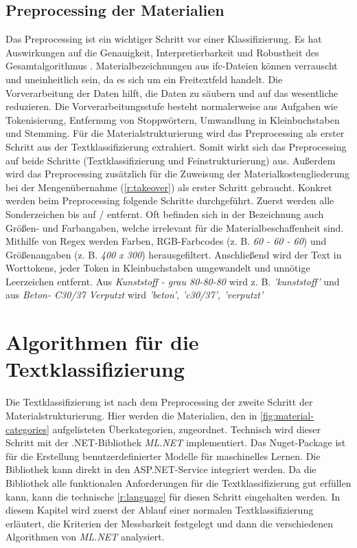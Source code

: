 \subsection{Preprocessing der Materialien}
\label{c:conception:architecture:preprocessing}
Das Preprocessing ist ein wichtiger Schritt vor einer Klassifizierung. Es hat Auswirkungen auf die Genauigkeit, Interpretierbarkeit und Robustheit des Gesamtalgorithmus \citep[vgl.][]{Zelaya_2019}. Materialbezeichnungen aus \ac{ifc}-Dateien können verrauscht und uneinheitlich sein, da es sich um ein Freitextfeld handelt. Die Vorverarbeitung der Daten hilft, die Daten zu säubern und auf das wesentliche reduzieren. \citep[vgl.][]{Priyanga_2016}
Die Vorverarbeitungsstufe besteht normalerweise aus Aufgaben wie Tokenisierung, Entfernung von Stoppwörtern, Umwandlung in Kleinbuchstaben und Stemming. \citep[vgl.][]{Uysal_2014}
Für die Materialstrukturierung wird das Preprocessing als erster Schritt aus der Textklassifizierung extrahiert. Somit wirkt sich das Preprocessing auf beide Schritte (Textklassifizierung und Feinstrukturierung) aus. Außerdem wird das Preprocessing zusätzlich für die Zuweisung der Materialkostengliederung bei der Mengenübernahme (\autoref{r:takeover}) als erster Schritt gebraucht.
Konkret werden beim Preprocessing folgende Schritte durchgeführt. Zuerst werden alle Sonderzeichen bis auf \glqq /\grqq{} entfernt. Oft befinden sich in der Bezeichnung auch Größen- und Farbangaben, welche irrelevant für die Materialbeschaffenheit sind.
Mithilfe von Regex werden Farben, RGB-Farbcodes (z. B. \textit{60 - 60 - 60}) und Größenangaben (z. B. \textit{400 x 300}) herausgefiltert. Anschließend wird der Text in Worttokens, jeder Token in Kleinbuchstaben umgewandelt und unnötige Leerzeichen entfernt. Aus \textit{\glqq Kunststoff - grau 80-80-80\grqq{}} wird z. B. \textit{\glqq 'kunststoff'\grqq{}} und aus \textit{\glqq Beton- C30/37 Verputzt\grqq{}} wird \textit{\glqq 'beton', 'c30/37', 'verputzt'\grqq{}}

\section{Algorithmen für die Textklassifizierung}
\label{c:conception:classification}
Die Textklassifizierung ist nach dem Preprocessing der zweite Schritt der Materialstrukturierung. Hier werden die Materialien, den in \autoref{fig:material-categories} aufgelisteten Überkategorien, zugeordnet.
Technisch wird dieser Schritt mit der .NET-Bibliothek \textit{ML.NET} \citep[vgl.][]{Ahmed_2019} implementiert. Das Nuget-Package ist für die Erstellung benutzerdefinierter Modelle für maschinelles Lernen. \citep[vgl.][]{mlnet_doc2022} Die Bibliothek kann direkt in den ASP.NET-Service integriert werden. Da die Bibliothek alle funktionalen Anforderungen für die Textklassifizierung gut erfüllen kann, kann die technische \autoref{r:language} für diesen Schritt eingehalten werden. In diesem Kapitel wird zuerst der Ablauf einer normalen Textklassifizierung erläutert, die Kriterien der Messbarkeit festgelegt und dann die verschiedenen Algorithmen von \textit{ML.NET} analysiert.

